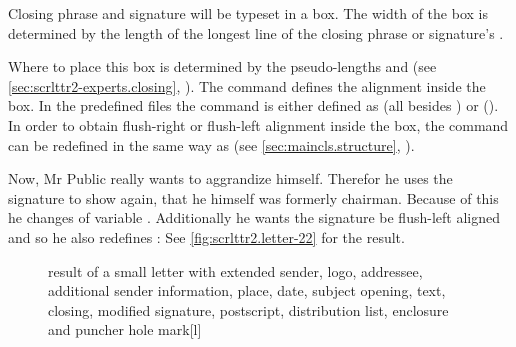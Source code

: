 \begin{Declaration}
\end{Declaration}
%
Closing phrase and signature will be typeset in a box. The width of
the box is determined by the length of the longest line of the closing
phrase or signature's .

Where to place this box is determined by the pseudo-lengths
 and
 (see
\autoref{sec:scrlttr2-experts.closing},
). The command
 defines the alignment inside the box. In the
predefined  files the command is either defined as 
(all besides ) or  ().  In
order to obtain flush-right or flush-left alignment inside the box, the
command can be redefined in the same way as  (see
\autoref{sec:maincls.structure},
).

\begin{Example}
  Now, Mr Public really wants to aggrandize himself. Therefor he uses the
  signature to show again, that he himself was formerly chairman. Because of
  this he changes  of variable
  . Additionally he wants the signature be flush-left
  aligned and so he also redefines :%
  See \autoref{fig:scrlttr2.letter-22} for the result.
  \begin{figure}
    \setcapindent{0pt}%
    \begin{captionbeside}
      {result of a small letter with extended sender, logo, addressee,
        additional sender information, place, date, subject opening, text,
        closing, modified signature, postscript, distribution list, enclosure
        and puncher hole mark}[l]
    \end{captionbeside}
    \label{fig:scrlttr2.letter-22}
  \end{figure}
\end{Example}
%
%
%
%
%
%
%
%
%



